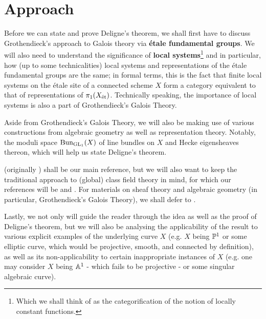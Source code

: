 	\section{Approach}
	    Before we can state and prove Deligne's theorem, we shall first have to discuss Grothendieck's approach to Galois theory via \textbf{\'etale fundamental groups}. We will also need to understand the significance of \textbf{local systems}\footnote{Which we shall think of as the categorification of the notion of locally constant functions.} and in particular, how (up to some technicalities) local systems and representations of the \'etale fundamental groups are the same; in formal terms, this is the fact that finite local systems on the \'etale site of a connected scheme $X$ form a category equivalent to that of representations of $\pi_1(X_{\et})$. Technically speaking, the importance of local systems is also a part of Grothendieck's Galois Theory. 
	    
	    Aside from Grothendieck's Galois Theory, we will also be making use of various constructions from algebraic geometry as well as representation theory. Notably, the moduli space $\Bun_{\GL_1}(X)$ of line bundles on $X$ and Hecke eigensheaves thereon, which will help us state Deligne's theorem. 
	    
	    \cite{tendler_2015_geometric_class_field_theory} (originally \cite{tendler_2010_geometric_class_field_theory_original}) shall be our main reference, but we will also want to keep the traditional approach to (global) class field theory in mind, for which our references will be \cite[Chapter VI]{neukirch_2010_algebraic_number_theory} and \cite[Chapter VIII]{neukirch_1999_cohomology_of_number_field}. For materials on sheaf theory and algebraic geometry (in particular, Grothendieck's Galois Theory), we shall defer to \cite{stacks}. 
	    
	    Lastly, we not only will guide the reader through the idea as well as the proof of Deligne's theorem, but we will also be analysing the applicability of the result to various explicit examples of the underlying curve $X$ (e.g. $X$ being $\P^1$ or some elliptic curve, which would be projective, smooth, and connected by definition), as well as its non-applicability to certain inappropriate instances of $X$ (e.g. one may consider $X$ being $\A^1$ - which fails to be projective - or some singular algebraic curve).
	
	\printbibliography

